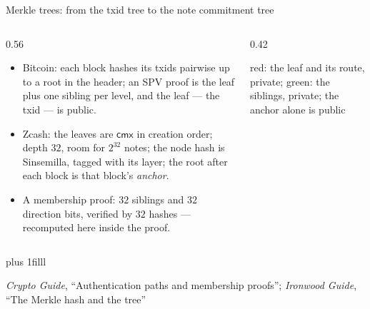 \documentclass[aspectratio=169,11pt]{beamer}
\newcommand{\cmx}{\ensuremath{\mathsf{cmx}}}
\newcommand{\src}[1]{\par\vskip0pt plus 1filll
  {\fontsize{6}{7.2}\selectfont\color{arbdim}\raggedright #1\par}}
\begin{document}
\begin{frame}{Merkle trees: from the txid tree to the note commitment tree}
\begin{columns}[c]
\begin{column}{0.56\textwidth}
\begin{itemize}
  \item Bitcoin: each block hashes its txids pairwise up to a root in the
    header; an SPV proof is the leaf plus one sibling per level, and the
    leaf --- the txid --- is public.
  \item Zcash: the leaves are $\cmx$ in creation order; depth $32$, room
    for $2^{32}$ notes; the node hash is Sinsemilla, tagged with its layer;
    the root after each block is that block's \emph{anchor}.
  \item A membership proof: $32$ siblings and $32$ direction bits, verified
    by $32$ hashes --- recomputed here inside the proof.
\end{itemize}
\end{column}
\begin{column}{0.42\textwidth}
\centering
{}
\par
{\scriptsize red: the leaf and its route, private; green: the siblings,
private; the anchor alone is public}
\end{column}
\end{columns}
\src{\emph{Crypto Guide}, ``Authentication paths and membership proofs'';
  \emph{Ironwood Guide}, ``The Merkle hash and the tree''}
\end{frame}
\end{document}

